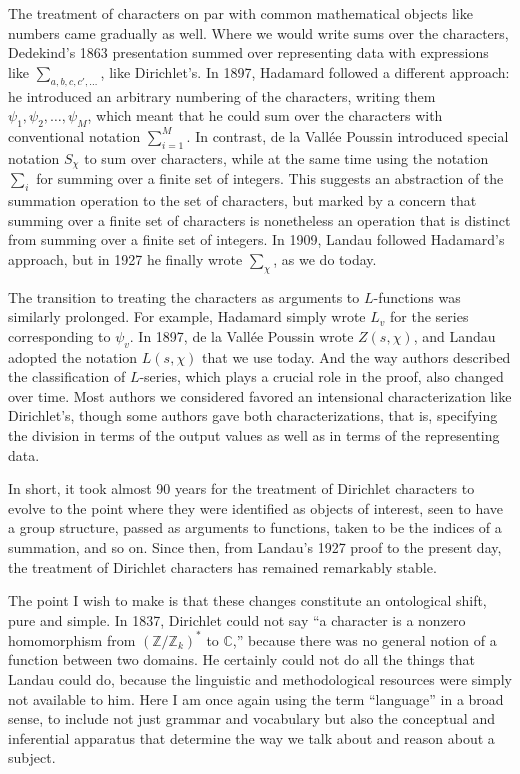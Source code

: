 \documentclass[12pt]{article}
\newcommand{\ZZ}{\mathbb{Z}}
\newcommand{\CC}{\mathbb{C}}
\begin{document}
The treatment of characters on par with common mathematical objects like numbers came gradually as well. Where we would write sums over the characters, Dedekind's 1863 presentation summed over representing data with expressions like $\sum_{a, b, c, c', \ldots}$, like Dirichlet's. In 1897, Hadamard followed a different approach: he introduced an arbitrary numbering of the characters, writing them $\psi_1, \psi_2, \ldots, \psi_M$, which meant that he could sum over the characters with conventional notation $\sum_{i = 1}^M$. In contrast, de la Vall\'ee Poussin introduced special notation $S_\chi$ to sum over characters, while at the same time using the notation $\sum_i$ for summing over a finite set of integers. This suggests an abstraction of the summation operation to the set of characters, but marked by a concern that summing over a finite set of characters is nonetheless an operation that is distinct from summing over a finite set of integers. In 1909, Landau followed Hadamard's approach, but in 1927 he finally wrote $\sum_\chi$, as we do today.

The transition to treating the characters as arguments to $L$-functions was similarly prolonged. For example, Hadamard simply wrote $L_v$ for the series corresponding to $\psi_v$. In 1897, de la Vall\'ee Poussin wrote $Z(s, \chi)$, and Landau adopted the notation $L(s, \chi)$ that we use today. And the way authors described the classification of $L$-series, which plays a crucial role in the proof, also changed over time. Most authors we considered favored an intensional characterization like Dirichlet's, though some authors gave both characterizations, that is, specifying the division in terms of the output values as well as in terms of the representing data.

In short, it took almost 90 years for the treatment of Dirichlet characters to evolve to the point where they were identified as objects of interest, seen to have a group structure, passed as arguments to functions, taken to be the indices of a summation, and so on. Since then, from Landau's 1927 proof to the present day, the treatment of Dirichlet characters has remained remarkably stable.

The point I wish to make is that these changes constitute an ontological shift, pure and simple. In 1837, Dirichlet could not say ``a character is a nonzero homomorphism from $(\ZZ/\ZZ_k)^*$ to $\CC$,'' because there was no general notion of a function between two domains. He certainly could not do all the things that Landau could do, because the linguistic and methodological resources were simply not available to him. Here I am once again using the term ``language'' in a broad sense, to include not just grammar and vocabulary but also the conceptual and inferential apparatus that determine the way we talk about and reason about a subject.
\end{document}
